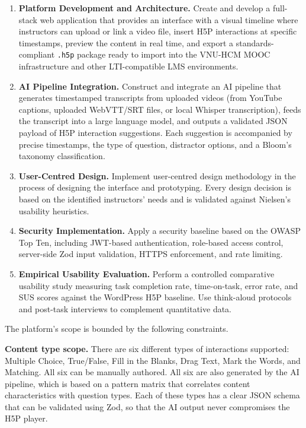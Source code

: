 \begin{enumerate}
  \item \textbf{Platform Development and Architecture.} Create and develop a full-stack web application that provides an interface with a visual timeline where instructors can upload or link a video file, insert H5P interactions at specific timestamps, preview the content in real time, and export a standards-compliant \texttt{.h5p} package ready to import into the VNU-HCM MOOC infrastructure and other LTI-compatible LMS environments.

  \item \textbf{AI Pipeline Integration.} Construct and integrate an AI pipeline that generates timestamped transcripts from uploaded videos (from YouTube captions, uploaded WebVTT/SRT files, or local Whisper transcription), feeds the transcript into a large language model, and outputs a validated JSON payload of H5P interaction suggestions. Each suggestion is accompanied by precise timestamps, the type of question, distractor options, and a Bloom's taxonomy classification.

  \item \textbf{User-Centred Design.} Implement user-centred design methodology in the process of designing the interface and prototyping. Every design decision is based on the identified instructors' needs and is validated against Nielsen's usability heuristics.

  \item \textbf{Security Implementation.} Apply a security baseline based on the OWASP Top Ten, including JWT-based authentication, role-based access control, server-side Zod input validation, HTTPS enforcement, and rate limiting.

  \item \textbf{Empirical Usability Evaluation.} Perform a controlled comparative usability study measuring task completion rate, time-on-task, error rate, and SUS scores against the WordPress H5P baseline. Use think-aloud protocols and post-task interviews to complement quantitative data.
\end{enumerate}

The platform's scope is bounded by the following constraints.

\textbf{Content type scope.} There are six different types of interactions supported: Multiple Choice, True/False, Fill in the Blanks, Drag Text, Mark the Words, and Matching. All six can be manually authored. All six are also generated by the AI pipeline, which is based on a pattern matrix that correlates content characteristics with question types. Each of these types has a clear JSON schema that can be validated using Zod, so that the AI output never compromises the H5P player.

